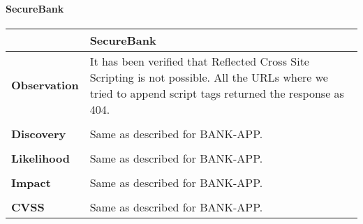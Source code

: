 \paragraph{SecureBank} \mbox{}
\begin{longtable*}{p{.20\textwidth} | p{.80\textwidth}}
    \hline
    & \textbf{SecureBank} \\
    \hline
    \textbf{Observation} &
        It has been verified that Reflected Cross Site Scripting is not possible. All the URLs where we tried to append script tags returned the response as 404.
    \\\\
    \textbf{Discovery} &
    	Same as described for BANK-APP.
    \\\\ 
    \textbf{Likelihood} &
        Same as described for BANK-APP.
    \\\\
    \textbf{Impact} &
        Same as described for BANK-APP.
    \\\\
    \textbf{CVSS} &
        Same as described for BANK-APP.
    \\
    \hline
\end{longtable*}
\clearpage